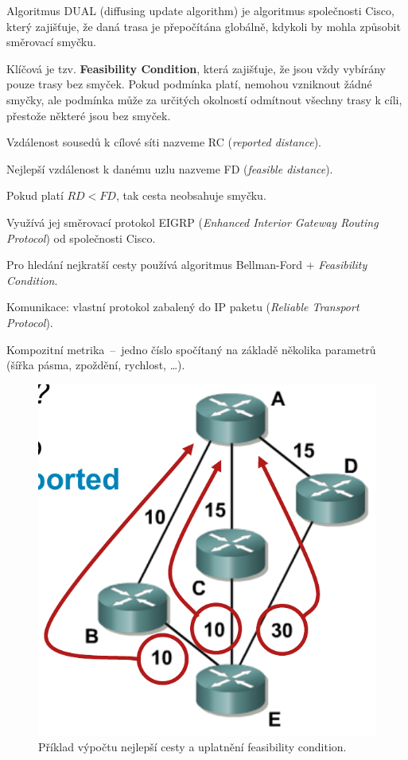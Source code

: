 \begin{compactitem}
    \item Algoritmus DUAL (diffusing update algorithm) je algoritmus společnosti Cisco, který zajišťuje, že daná trasa je přepočítána globálně, kdykoli by mohla způsobit směrovací smyčku.
    \item Klíčová je tzv. \textbf{Feasibility Condition}, která zajišťuje, že jsou vždy vybírány pouze trasy bez smyček. Pokud podmínka platí, nemohou vzniknout žádné smyčky, ale podmínka může za určitých okolností odmítnout všechny trasy k cíli, přestože některé jsou bez smyček. \begin{compactitem}
        \item Vzdálenost sousedů k cílové síti nazveme RC (\textit{reported distance}).
        \item Nejlepší vzdálenost k danému uzlu nazveme FD (\textit{feasible distance}).
        \item Pokud platí $RD < FD$, tak cesta neobsahuje smyčku.
    \end{compactitem}
    \item Využívá jej směrovací protokol EIGRP (\textit{Enhanced Interior Gateway Routing Protocol}) od společnosti Cisco. \begin{compactitem}
        \item Pro hledání nejkratší cesty používá algoritmus Bellman-Ford + \textit{Feasibility Condition}.
        \item Komunikace: vlastní protokol zabalený do IP paketu (\textit{Reliable Transport Protocol}).
        \item Kompozitní metrika~--~jedno číslo spočítaný na základě několika parametrů (šířka pásma, zpoždění, rychlost, \dots).
    \end{compactitem}
\end{compactitem}

\begin{figure}[H]
    \centering
    \includegraphics[width=0.4\linewidth]{feasibility_condition.pdf}
    \caption{Příklad výpočtu nejlepší cesty a uplatnění feasibility condition.}
\end{figure}


